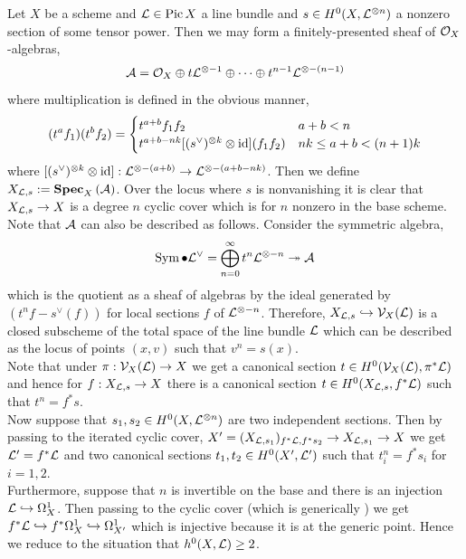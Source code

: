 \documentclass[main.tex]{subfiles}
\begin{document}
Let $X$ be a scheme and $\mathcal{L} \in \operatorname{\mathrm{Pic}}{X}$ a line bundle and $s \in H^0(X, \mathcal{L}^{\otimes n})$ a nonzero section of some tensor power. Then we may form a finitely-presented sheaf of $\mathcal{O}_{X}$-algebras,
\[ \mathcal{A} = \mathcal{O}_{X} \oplus t \mathcal{L}^{\otimes -1} \oplus \cdots \oplus t^{n-1} \mathcal{L}^{\otimes -(n-1)} \]
where multiplication is defined in the obvious manner,
\[ (t^a f_1) (t^b f_2)  =
\begin{cases}
t^{a+b} f_1 f_2 & a + b < n
\\
t^{a + b - nk} [(s^\vee)^{\otimes k} \otimes \mathrm{id}](f_1 f_2) & nk \le a + b < (n+1)k
\end{cases}  \]
where $[(s^\vee)^{\otimes k} \otimes \mathrm{id}] : \mathcal{L}^{\otimes -(a+b)} \to \mathcal{L}^{\otimes -(a + b - nk)}$. Then we define $X_{\mathcal{L}, s} := \mathbf{Spec}_{X}\left( \mathcal{A} \right)$. Over the locus where $s$ is nonvanishing it is clear that $X_{\mathcal{L}, s} \to X$ is a degree $n$ cyclic cover which is \etale for $n$ nonzero in the base scheme.
\bigskip\\
Note that $\mathcal{A}$ can also be described as follows. Consider the symmetric algebra,
\[ \operatorname{\mathrm{Sym}}{\bullet}{\mathcal{L}^\vee} = \bigoplus_{n = 0}^\infty t^n \mathcal{L}^{\otimes -n} \twoheadrightarrow \mathcal{A} \]
which is the quotient as a sheaf of algebras by the ideal generated by $(t^n f - s^\vee(f))$ for local sections $f$ of $\mathcal{L}^{\otimes -n}$. Therefore, $X_{\mathcal{L}, s} \hookrightarrow \mathcal{V}_X(\mathcal{L})$ is a closed subscheme of the total space of the line bundle $\mathcal{L}$ which can be described as the locus of points $(x, v)$ such that $v^n = s(x)$.
\bigskip\\
Note that under $\pi : \mathcal{V}_X(\mathcal{L}) \to X$ we get a canonical section $t \in H^0(\mathcal{V}_X(\mathcal{L}), \pi^* \mathcal{L})$ and hence for $f : X_{\mathcal{L}, s} \to X$ there is a canonical section $t \in H^0(X_{\mathcal{L}, s}, f^* \mathcal{L})$ such that $t^n = f^* s$.
\bigskip\\
Now suppose that $s_1, s_2 \in H^0(X, \mathcal{L}^{\otimes n})$ are two independent sections. Then by passing to the iterated cyclic cover, $X' = (X_{\mathcal{L}, s_1})_{f^* \mathcal{L}, f^* s_2} \to X_{\mathcal{L}, s_1} \to X$ we get $\mathcal{L}' = f^* \mathcal{L}$ and two canonical sections $t_1, t_2 \in H^0(X', \mathcal{L}')$ such that $t_i^n = f^* s_i$ for $i = 1,2$.
\bigskip\\
Furthermore, suppose that $n$ is invertible on the base and there is an injection $\mathcal{L} \hookrightarrow \Omega_X^1$. Then passing to the cyclic cover (which is generically \etale) we get $f^* \mathcal{L} \hookrightarrow f^* \Omega_X^1 \hookrightarrow \Omega_{X'}^1$ which is injective because it is at the generic point. Hence we reduce to the situation that $h^0(X, \mathcal{L}) \ge 2$.
\end{document}
